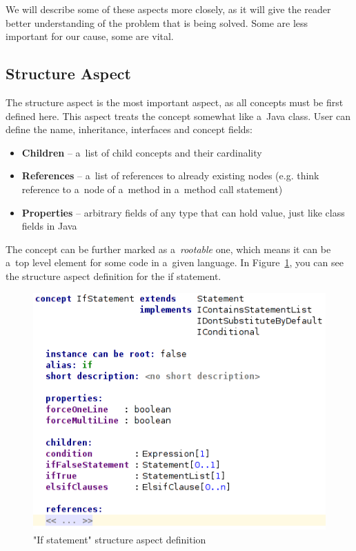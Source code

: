 We will describe some of these aspects more closely, as it will give the reader better understanding of the problem that is being solved.
Some are less important for our cause, some are vital.

\subsection{Structure Aspect}

The structure aspect is the most important aspect, as all concepts must be first defined here.
This aspect treats the concept somewhat like a~Java class.
User can define the name, inheritance, interfaces and concept fields:

\begin{itemize}
	\item \textbf{Children} -- a~list of child concepts and their cardinality

	\item \textbf{References} -- a~list of references to already existing nodes (e.g. think reference to a~node of a~method in a~method call statement)

	\item \textbf{Properties} -- arbitrary fields of any type that can hold value, just like class fields in Java
\end{itemize}

The concept can be further marked as a~\textit{rootable} one, which means it can be a~top level element for some code in a~given language.
In Figure~\ref{fig:if_statement_structure}, you can see the structure aspect definition for the if statement.

\begin{figure}[ht]
	\centering
	\includegraphics[scale=0.75]{./img/if_statement_structure.png}
	\caption{"If statement" structure aspect definition}
	\label{fig:if_statement_structure}
\end{figure}

